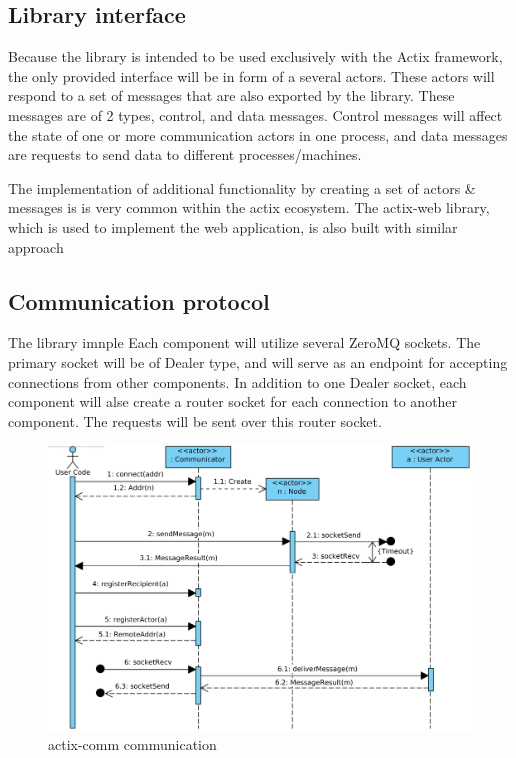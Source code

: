 \subsection{Library interface}
Because the library is intended to be used exclusively with the Actix framework, the only provided interface will be in form
of a several actors. These actors will respond to a set of messages that are also exported by the library. These messages
are of 2 types, control, and data messages. Control messages will affect the state of one or more communication actors
in one process, and data messages are requests to send data to different processes/machines.

The implementation of additional functionality by creating a set of actors \& messages is is very common within the actix ecosystem.
The actix-web library, which is used to implement the web application, is also built with similar approach

\subsection{Communication protocol}
The library imnple
Each component will utilize several ZeroMQ sockets. The primary socket will be of Dealer type, and will serve as an endpoint
for accepting connections from other components. In addition to one Dealer socket, each component will alse create a router
socket for each connection to another component. The requests will be sent over this router socket.

\begin{figure}[H]
    \includegraphics[width=\textwidth]{obrazky-figures/actix-net communication.png}
    \caption{actix-comm communication}
    \label{img:actix_comm}
\end{figure}

